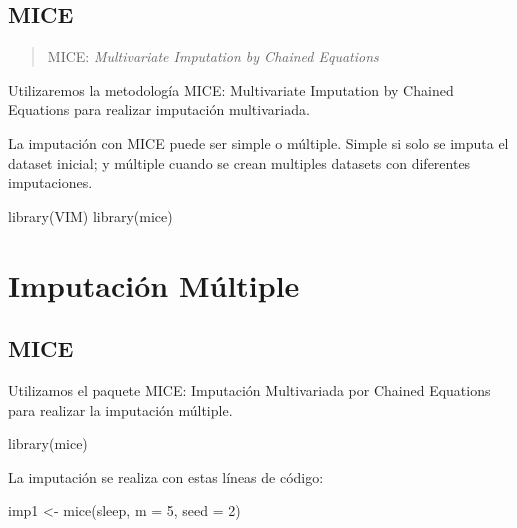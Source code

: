 \documentclass[
]{article}
\newenvironment{Shaded}{\begin{snugshade}}{\end{snugshade}}
\newcommand{\AttributeTok}[1]{\textcolor[rgb]{0.77,0.63,0.00}{#1}}
\newcommand{\DecValTok}[1]{\textcolor[rgb]{0.00,0.00,0.81}{#1}}
\newcommand{\FunctionTok}[1]{\textcolor[rgb]{0.00,0.00,0.00}{#1}}
\newcommand{\NormalTok}[1]{#1}
\newcommand{\OtherTok}[1]{\textcolor[rgb]{0.56,0.35,0.01}{#1}}
\begin{document}
\hypertarget{mice}{%
\subsection{MICE}\label{mice}}

\begin{quote}
MICE: \emph{Multivariate Imputation by Chained Equations}
\end{quote}

Utilizaremos la metodología MICE: Multivariate Imputation by Chained
Equations para realizar imputación multivariada.

La imputación con MICE puede ser simple o múltiple. Simple si solo se
imputa el dataset inicial; y múltiple cuando se crean multiples datasets
con diferentes imputaciones.

\begin{Shaded}
\begin{Highlighting}[]
\FunctionTok{library}\NormalTok{(VIM)}
\FunctionTok{library}\NormalTok{(mice)}
\end{Highlighting}
\end{Shaded}

\hypertarget{imputaciuxf3n-muxfaltiple}{%
\section{Imputación Múltiple}\label{imputaciuxf3n-muxfaltiple}}

\hypertarget{mice-1}{%
\subsection{MICE}\label{mice-1}}

Utilizamos el paquete MICE: Imputación Multivariada por Chained
Equations para realizar la imputación múltiple.

\begin{Shaded}
\begin{Highlighting}[]
\FunctionTok{library}\NormalTok{(mice)}
\end{Highlighting}
\end{Shaded}

La imputación se realiza con estas líneas de código:

\begin{Shaded}
\begin{Highlighting}[]
\NormalTok{imp1 }\OtherTok{\textless{}{-}} \FunctionTok{mice}\NormalTok{(sleep, }\AttributeTok{m =} \DecValTok{5}\NormalTok{, }\AttributeTok{seed =} \DecValTok{2}\NormalTok{)}
\end{Highlighting}
\end{Shaded}
\end{document}

